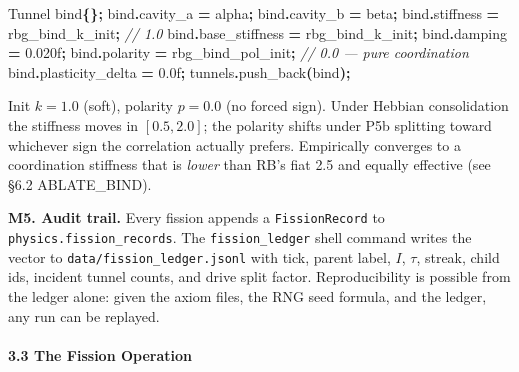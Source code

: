 \documentclass[
  11pt,
  a4paper,
]{article}
\newenvironment{Shaded}{\begin{snugshade}}{\end{snugshade}}
\newcommand{\BuiltInTok}[1]{#1}
\newcommand{\CommentTok}[1]{\textcolor[rgb]{0.56,0.35,0.01}{\textit{#1}}}
\newcommand{\FloatTok}[1]{\textcolor[rgb]{0.00,0.00,0.81}{#1}}
\newcommand{\NormalTok}[1]{#1}
\newcommand{\OperatorTok}[1]{\textcolor[rgb]{0.81,0.36,0.00}{\textbf{#1}}}
\begin{document}
\begin{Shaded}
\begin{Highlighting}[]
\NormalTok{Tunnel bind}\OperatorTok{\{\};}
\NormalTok{bind}\OperatorTok{.}\NormalTok{cavity\_a       }\OperatorTok{=}\NormalTok{ alpha}\OperatorTok{;}
\NormalTok{bind}\OperatorTok{.}\NormalTok{cavity\_b       }\OperatorTok{=}\NormalTok{ beta}\OperatorTok{;}
\NormalTok{bind}\OperatorTok{.}\NormalTok{stiffness      }\OperatorTok{=}\NormalTok{ rbg\_bind\_k\_init}\OperatorTok{;}   \CommentTok{// 1.0}
\NormalTok{bind}\OperatorTok{.}\NormalTok{base\_stiffness }\OperatorTok{=}\NormalTok{ rbg\_bind\_k\_init}\OperatorTok{;}
\NormalTok{bind}\OperatorTok{.}\NormalTok{damping        }\OperatorTok{=} \FloatTok{0.020}\BuiltInTok{f}\OperatorTok{;}
\NormalTok{bind}\OperatorTok{.}\NormalTok{polarity       }\OperatorTok{=}\NormalTok{ rbg\_bind\_pol\_init}\OperatorTok{;}  \CommentTok{// 0.0 — pure coordination}
\NormalTok{bind}\OperatorTok{.}\NormalTok{plasticity\_delta }\OperatorTok{=} \FloatTok{0.0}\BuiltInTok{f}\OperatorTok{;}
\NormalTok{tunnels}\OperatorTok{.}\NormalTok{push\_back}\OperatorTok{(}\NormalTok{bind}\OperatorTok{);}
\end{Highlighting}
\end{Shaded}

Init \(k = 1.0\) (soft), polarity \(p = 0.0\) (no forced sign). Under
Hebbian consolidation the stiffness moves in \([0.5, 2.0]\); the
polarity shifts under P5b splitting toward whichever sign the
correlation actually prefers. Empirically converges to a coordination
stiffness that is \emph{lower} than RB's fiat 2.5 and equally effective
(see §6.2 ABLATE\_BIND).

\textbf{M5. Audit trail.} Every fission appends a \texttt{FissionRecord}
to \texttt{physics.fission\_records}. The \texttt{fission\_ledger} shell
command writes the vector to \texttt{data/fission\_ledger.jsonl} with
tick, parent label, \(I\), \(\tau\), streak, child ids, incident tunnel
counts, and drive split factor. Reproducibility is possible from the
ledger alone: given the axiom files, the RNG seed formula, and the
ledger, any run can be replayed.

\paragraph{3.3 The Fission Operation}\label{the-fission-operation}
\end{document}
